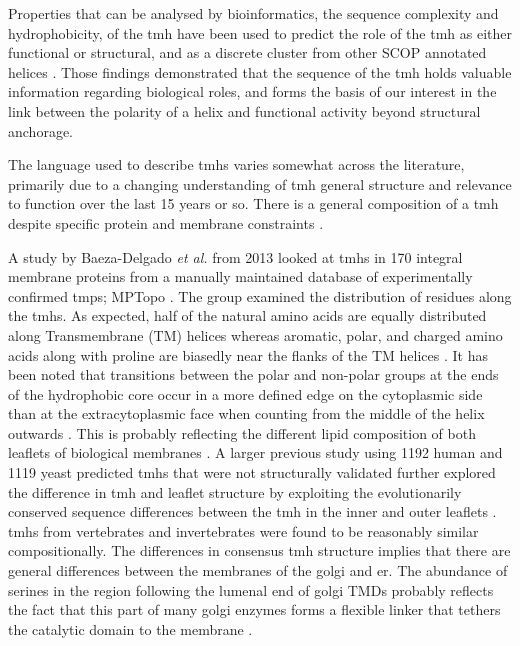 

Properties that can be analysed by bioinformatics, the sequence complexity and hydrophobicity, of the \gls{tmh} have been used to predict the role of the \gls{tmh} as either functional or structural, and as a discrete cluster from other SCOP annotated helices \cite{Wong2012}. Those findings demonstrated that the sequence of the \gls{tmh} holds valuable information regarding biological roles, and forms the basis of our interest in the link between the polarity of a helix and functional activity beyond structural anchorage.

The language used to describe \gls{tmh}s varies somewhat across the literature, primarily due to a changing understanding of \gls{tmh} general structure and relevance to function over the last 15 years or so. There is a general composition of a \gls{tmh} despite specific protein and membrane constraints \cite{Sharpe2010}.

A study by Baeza-Delgado {\it et al.} from 2013 \cite{Baeza-Delgado2013} looked at \gls{tmh}s in 170 integral membrane proteins from a manually maintained database of experimentally confirmed \gls{tmp}s; MPTopo \cite{Jayasinghe2001}. The group examined the distribution of residues along the \gls{tmh}s. As expected, half of the natural amino acids are equally distributed along Transmembrane (TM) helices whereas aromatic, polar, and charged amino acids along with proline are biasedly near the flanks of the TM helices \cite{Baeza-Delgado2013}. It has been noted that transitions between the polar and non-polar groups at the ends of the hydrophobic core occur in a more defined edge on the cytoplasmic side than at the extracytoplasmic face when counting from the middle of the helix outwards \cite{Baeza-Delgado2013}. This is probably reflecting the different lipid composition of both leaflets of biological membranes \cite{Baeza-Delgado2013}. A larger previous study using 1192 human and 1119 yeast predicted \gls{tmh}s that were not structurally validated further explored the difference in \gls{tmh} and leaflet structure by exploiting the evolutionarily conserved sequence differences between the \gls{tmh} in the inner and outer leaflets \cite{Sharpe2010}. \gls{tmh}s from vertebrates and invertebrates were found to be reasonably similar compositionally. The differences in consensus \gls{tmh} structure implies that there are general differences between the membranes of the golgi and \gls{er}. The abundance of serines in the region following the lumenal end of golgi TMDs probably reflects the fact that this part of many golgi enzymes forms a flexible linker that tethers the catalytic domain to the membrane \cite{Sharpe2010}.

